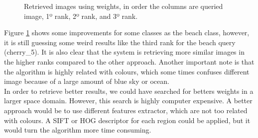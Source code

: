 \documentclass[12pt,a4paper]{article}
\begin{document}
\begin{figure}[!h]
{{		}
	}
	\enskip
	{
		{
			\setlength{\fboxsep}{1pt}
			\setlength{\fboxrule}{1pt}
		}
	}
	
	
	\caption{Retrieved images using weights, in order the columns are queried image, 1º rank, 2º rank, and 3º rank.}
	\label{fig:complexAvr}
\end{figure}

Figure \ref{fig:complexAvr} shows some improvements for some classes as the beach class, however, it is still guessing some weird results like the third rank for the beach query (cherry\_5). It is also clear that the system is retrieving more similar images in the higher ranks compared to the other approach. Another important note is that the algorithm is highly related with colours, which some times confuses different image because of a large amount of blue sky or ocean. \\

In order to retrieve better results, we could have searched for betters weights in a larger space domain. However, this search is highly computer expensive. A better approach would be to use different features extractor, which are not too related with colours. A SIFT or HOG descriptor for each region could be applied, but it would turn the algorithm more time consuming. 
\end{document}
